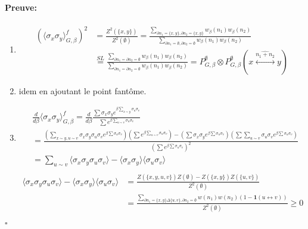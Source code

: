 \documentclass[a4paper,12pt]{report}
\newenvironment{preuve}{\paragraph{Preuve:}}{\hfill$\square$}
\begin{document}
\begin{preuve}

\begin{enumerate}

\item 
\begin{align*}
(\langle \sigma_x \sigma_y \rangle_{G,\beta}^f)^2 
&= \frac{Z^2(\{x,y\})}{Z^2(\emptyset)} 
= \frac{\sum_{\partial n_1 = \{x,y\},\partial n_2 = \{x,y\}}w_\beta(n_1)w_\beta(n_2)}{\sum_{\partial n_1 = \emptyset,\partial n_2 = \emptyset}w_\beta(n_1)w_\beta(n_2)}\\ 
&\overset{SL}{=} \frac{\sum_{\partial n_1 = \partial n_2 = \emptyset}w_\beta(n_1)w_\beta(n_2)}{\sum_{\partial n_1 = \partial n_2 = \emptyset}w_\beta(n_1)w_\beta(n_2)} = P_{G,\beta}^\emptyset \otimes P_{G,\beta}^\emptyset (x\overset{\widehat{n_1+n_2}}{\longleftrightarrow} y)
\end{align*}

\item idem en ajoutant le point fantôme.

\item 
\begin{align*}
&\frac{d}{d\beta}\langle \sigma_x \sigma_y \rangle_{G,\beta}^f 
= \frac{d}{d\beta} \frac{\sum \sigma_x \sigma_y e^{\beta \sum_{x\sim y}\sigma_u \sigma_v}}{\sum e^{\beta\sum_{u\sim v}\sigma_u \sigma_v}}\\ 
&= \frac{(\sum_{x\sim y,u\sim v}\sigma_x\sigma_y\sigma_u\sigma_v e^{\beta \sum \sigma_u\sigma_v})(\sum e^{\beta\sum_{u\sim v}\sigma_u \sigma_v}) - (\sum \sigma_x\sigma_y e^{\beta\sum\sigma_u\sigma_v})(\sum\sum_{u\sim v}\sigma_u\sigma_v e^{\beta \sum\sigma_u\sigma_v})}{(\sum e^{\beta \sum \sigma_u \sigma_v})^2} \\
&= \sum_{u\sim v}\langle \sigma_x \sigma_y \sigma_u \sigma_v\rangle - \langle \sigma_x \sigma_y\rangle\langle \sigma_u \sigma_v \rangle \\
\end{align*}
\begin{align*}
\langle \sigma_x \sigma_y \sigma_u \sigma_v\rangle - \langle \sigma_x \sigma_y\rangle\langle \sigma_u \sigma_v \rangle 
&= \frac{Z(\{x,y,u,v\})Z(\emptyset) - Z(\{x,y\})Z(\{u,v\})}{Z^2(\emptyset)} \\ 
&= \frac{\sum_{\partial n_1 = \{x,y\}\Delta\{u,v\},\partial n_2 = \emptyset}w(n_1)w(n_2)(1-\mathbf{1}(u\longleftrightarrow v))}{Z^2(\emptyset)} \geq 0
\end{align*}
\end{enumerate}
\end{preuve}
\end{document}
